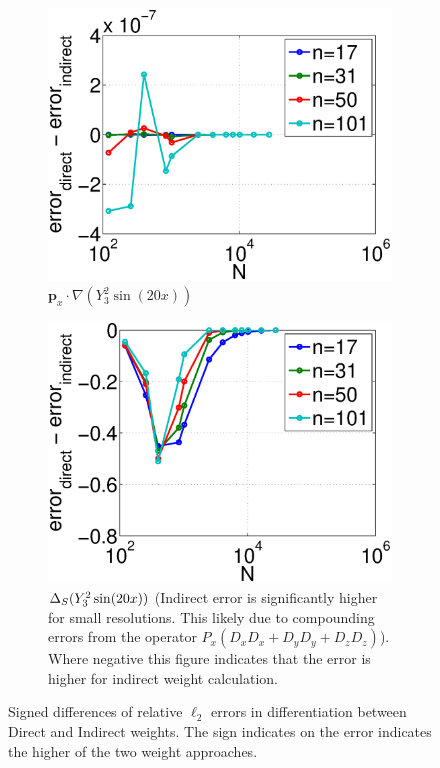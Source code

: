 \begin{figure}
	\centering
	\begin{subfigure}[t]{0.48\textwidth}
	\includegraphics[width=1.0\textwidth]{../figures/appendices/direct_vs_indirect_weights/compare_weight_generation/xsfc_vs_xsfc_alt_on_sph32_times_sine_20x/diff_of_rel_l2_errors.eps}
	\caption{$\mathbf{p}_{x} \cdot \nabla ( Y_{3}^{2} \sin(20 x))$}
	\end{subfigure}
		\begin{subfigure}[t]{0.48\textwidth}
	\centering
	\includegraphics[width=1.0\textwidth]{../figures/appendices/direct_vs_indirect_weights/compare_weight_generation/lsfc_vs_px_grad_dot_px_grad/diff_of_rel_l2_errors.eps}
	\caption{$\Delta_S ( Y_{3}^{2} \sin(20 x) )$ (Indirect error is significantly higher for small resolutions. This likely due to compounding errors from the operator $P_x (D_x D_x + D_y D_y + D_z D_z)$). Where negative this figure indicates that the error is higher for indirect weight calculation. }
	\end{subfigure}
	\caption{Signed differences of relative $\ell_{2}$ errors in differentiation between Direct and Indirect weights. The sign indicates on the error indicates the higher of the two weight approaches.}
\end{figure}



